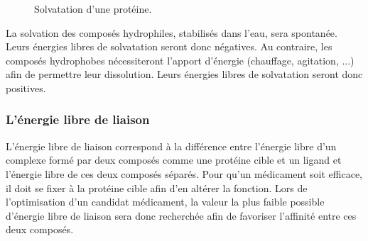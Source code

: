 \begin{figure}[h]
  \center
      \caption{Solvatation d'une protéine.}
      \label{fig:solvatation_def}
\end{figure}


La solvation des composés hydrophiles, stabilisés dans l'eau, sera spontanée. Leurs énergies libres de solvatation seront donc négatives. Au contraire, les composés hydrophobes nécessiteront l'apport d'énergie (chauffage, agitation, ...) afin de permettre leur dissolution. Leurs énergies libres de solvatation seront donc positives. 

\subsubsection{L'énergie libre de liaison}
L'énergie libre de liaison correspond à la différence  entre l'énergie libre d'un complexe formé par deux composés comme une protéine cible et un ligand et l'énergie libre de ces deux composés séparés. Pour qu'un médicament soit efficace, il doit se fixer à la protéine cible afin d'en altérer la fonction. Lors de l'optimisation d'un candidat médicament, la valeur la plus faible possible d'énergie libre de liaison sera donc recherchée afin de favoriser l'affinité entre ces deux composés.





